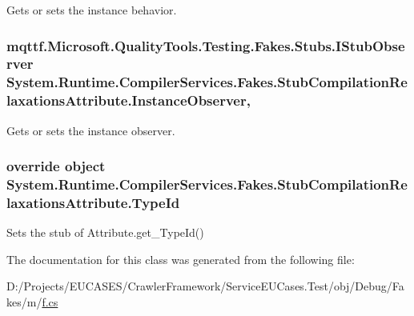 Gets or sets the instance behavior.

\hypertarget{class_system_1_1_runtime_1_1_compiler_services_1_1_fakes_1_1_stub_compilation_relaxations_attribute_ace85e5c60006755a22c0a15d2495a74d}{
\subsubsection[{Instance\-Observer}]{\setlength{\rightskip}{0pt plus 5cm}mqttf.\-Microsoft.\-Quality\-Tools.\-Testing.\-Fakes.\-Stubs.\-I\-Stub\-Observer System.\-Runtime.\-Compiler\-Services.\-Fakes.\-Stub\-Compilation\-Relaxations\-Attribute.\-Instance\-Observer\hspace{0.3cm}{\ttfamily [get]}, {\ttfamily [set]}}}\label{class_system_1_1_runtime_1_1_compiler_services_1_1_fakes_1_1_stub_compilation_relaxations_attribute_ace85e5c60006755a22c0a15d2495a74d}


Gets or sets the instance observer.

\hypertarget{class_system_1_1_runtime_1_1_compiler_services_1_1_fakes_1_1_stub_compilation_relaxations_attribute_a3bc33c77f4432860c06c98e5cc872527}{
\subsubsection[{Type\-Id}]{\setlength{\rightskip}{0pt plus 5cm}override object System.\-Runtime.\-Compiler\-Services.\-Fakes.\-Stub\-Compilation\-Relaxations\-Attribute.\-Type\-Id\hspace{0.3cm}{\ttfamily [get]}}}\label{class_system_1_1_runtime_1_1_compiler_services_1_1_fakes_1_1_stub_compilation_relaxations_attribute_a3bc33c77f4432860c06c98e5cc872527}


Sets the stub of Attribute.\-get\-\_\-\-Type\-Id()



The documentation for this class was generated from the following file\-:\begin{DoxyCompactItemize}
\item 
D\-:/\-Projects/\-E\-U\-C\-A\-S\-E\-S/\-Crawler\-Framework/\-Service\-E\-U\-Cases.\-Test/obj/\-Debug/\-Fakes/m/\hyperlink{m_2f_8cs}{f.\-cs}\end{DoxyCompactItemize}
